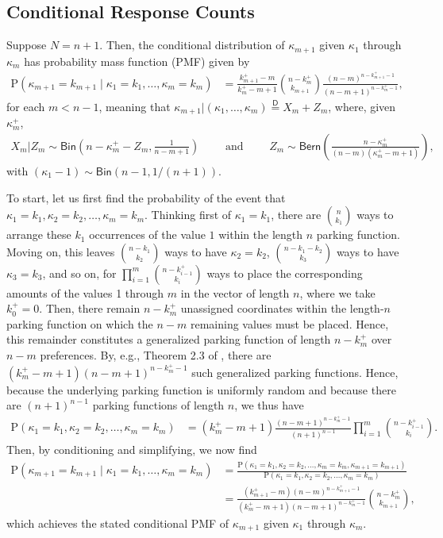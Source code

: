 \documentclass[stsy,dblanonrev]{amers/INFORMS-STSY-Template-26-02-2026/informs4}
\newcommand{\PP}[1]{\mathrm{P}\left(#1\right)}
\begin{document}
\subsection{Conditional Response Counts}
\begin{lemma}\label{kappaCPMF}
Suppose $N=n+1$. Then, the conditional distribution of $\kappa_{m+1}$ given $\kappa_1$ through $\kappa_m$ has probability mass function (PMF) given by
\begin{align}
\PP{\kappa_{m+1} = k_{m+1} \mid \kappa_1 = k_1, \dots, \kappa_m = k_m}
&=
\frac{k_{m+1}^+ - m}{k_m^+ - m + 1}
{n - k_m^+ \choose k_{m+1}}
\frac{\left(n-m\right)^{n-k_{m+1}^+-1}}{(n-m+1)^{n-k_m^+-1}}
,
\end{align}
for each $m < n - 1$, meaning that $\kappa_{m+1} | (\kappa_1, \dots, \kappa_m) \stackrel{\mathsf{D}}{=} X_m + Z_m$, where, given $\kappa_m^+$,
\begin{align}
X_m | Z_m
\sim 
\mathsf{Bin}\left(
n - \kappa_m^+ - Z_m
,
\frac{1}{n-m+1}
\right)
\qquad
\text{ and }
\qquad
Z_m \sim 
\mathsf{Bern}\left(\frac{n-\kappa_m^+}{(n-m)(\kappa_m^+ - m + 1)} \right)
,
\end{align}
with $(\kappa_1 - 1) \sim \mathsf{Bin}\left(n-1, 1/(n+1)\right)$.
\end{lemma}
To start, let us first find the probability of the event that $\kappa_1 = k_1, \kappa_2 = k_2, \dots, \kappa_m = k_m$. Thinking first of $\kappa_1 = k_1$, there are ${n \choose k_1}$ ways to arrange these $k_1$ occurrences of the value $1$ within the length $n$ parking function. Moving on, this leaves ${n - k_1 \choose k_2}$ ways to have $\kappa_2 = k_2$, ${n - k_1 - k_2 \choose k_3}$ ways to have $\kappa_3 = k_3$, and so on, for $\prod_{i=1}^m {n - k_{i-1}^+ \choose k_i}$ ways to place the corresponding amounts of the values 1 through $m$ in the vector of length $n$, where we take $k_0^+ = 0$. Then, there remain $n - k_m^+$ unassigned coordinates within the length-$n$ parking function on which the $n-m$ remaining values must be placed. Hence, this remainder constitutes a generalized parking function of length $n - k_m^+$ over $n-m$ preferences. By, e.g., Theorem 2.3 of \citet{kenyon2023parking}, there are $(k_m^+-m+1)(n-m+1)^{n - k_m^+-1}$ such generalized parking functions. Hence, because the underlying parking function is uniformly random and because there are $(n+1)^{n-1}$ parking functions of length $n$, we thus have
\begin{align}
\PP{\kappa_1 = k_1, \kappa_2 = k_2, \dots, \kappa_m = k_m}
&=
(k_m^+-m+1)
\frac{(n-m+1)^{n - k_m^+-1}}{(n+1)^{n-1}}
\prod_{i=1}^m {n - k_{i-1}^+ \choose k_i}
.
\end{align}
Then, by conditioning and simplifying, we now find
\begin{align}
\PP{\kappa_{m+1} = k_{m+1} \mid \kappa_1 = k_1, \dots, \kappa_m = k_m}
&=
\frac{\PP{\kappa_1 = k_1, \kappa_2 = k_2, \dots, \kappa_m = k_m, \kappa_{m+1} = k_{m+1}}}{\PP{\kappa_1 = k_1, \kappa_2 = k_2, \dots, \kappa_m = k_m}}
\\
&=
\frac{
(k_{m+1}^+-m)
(n-m)^{n - k_{m+1}^+-1}
}
{
(k_m^+-m+1)
(n-m+1)^{n - k_m^+-1}
}
{n - k_{m}^+ \choose k_{m+1}}
,
\end{align}
which achieves the stated conditional PMF of $\kappa_{m+1}$ given $\kappa_1$ through $\kappa_m$.
\end{document}
